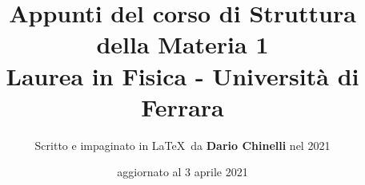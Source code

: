 \documentclass[11pt]{article}
\begin{document}
\title{\textbf{Appunti del corso di Struttura della Materia 1} \\
Laurea in Fisica - Università di Ferrara} 

\author{Scritto e impaginato in \LaTeX\ da \textbf{Dario Chinelli} nel 2021}

\date{aggiornato al 3 aprile 2021}

\maketitle

\newpage

\tableofcontents


    

    

    

    

    

    

    

    

    

    

    

    
    

    

    

    
    
    
    
    
    
    
    
\end{document}
